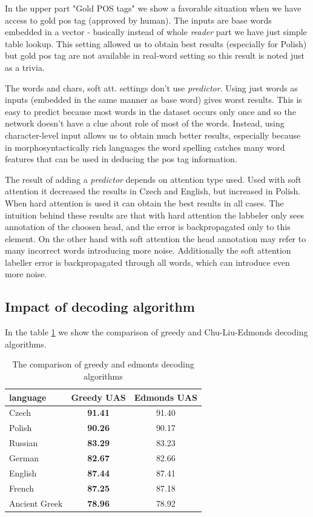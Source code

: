 In the upper part "Gold POS tags" we show a favorable situation when we have access
to gold pos tag (approved by human). The inputs are base words embedded in a vector - 
basically instead of whole \emph{reader} part we have just simple table lookup.
This setting allowed us to obtain best results (especially for Polish) but
gold pos tag are not available in real-word setting so this result is noted just
as a trivia.

The words and chars, soft att. settings don't use \emph{predictor}. Using just words
as inputs (embedded in the same manner as base word) gives worst results. This is
easy to predict because most words in the dataset occurs only once and so the
network doesn't have a clue about role of most of the words.
Instead, using character-level input allows us to obtain much better results, especially
because in morphosyntactically rich languages the word spelling catches many
word features that can be used in deducing the pos tag information.

The result of adding a \emph{predictor} depends on attention type used.
Used with soft attention it decreased the results in Czech and English, but increased
in Polish. When hard attention is used it can obtain the best results in all cases.
The intuition behind these results are that with hard attention the labbeler only
sees annotation of the choosen head, and the error is backpropagated only to this
element. On the other hand with soft attention the head annotation may refer
to many incorrect words introducing more noise. Additionally the soft attention labeller
error is backpropagated through all words, which can introduce even more noise.


\subsection{Impact of decoding algorithm}

In the table \ref{tab:edmonts_baseline} we show the comparison of greedy and
Chu-Liu-Edmonds decoding algorithms.

\begin{table}[!htbp]
  \centering
  \begin{tabular}{l | c c}
    language & Greedy UAS & Edmonds UAS \\ \hline
      Czech & \textbf{91.41} & 91.40 \\
      Polish &  \textbf{90.26} & 90.17 \\
      Russian & \textbf{83.29} & 83.23 \\
      German &  \textbf{82.67} & 82.66 \\
      English & \textbf{87.44} & 87.41 \\
      French &  \textbf{87.25} & 87.18 \\
      Ancient Greek & \textbf{78.96} & 78.92
  \end{tabular}
  \caption{The comparison of greedy and edmonts decoding algorithms}
  \label{tab:edmonts_baseline}
\end{table}

